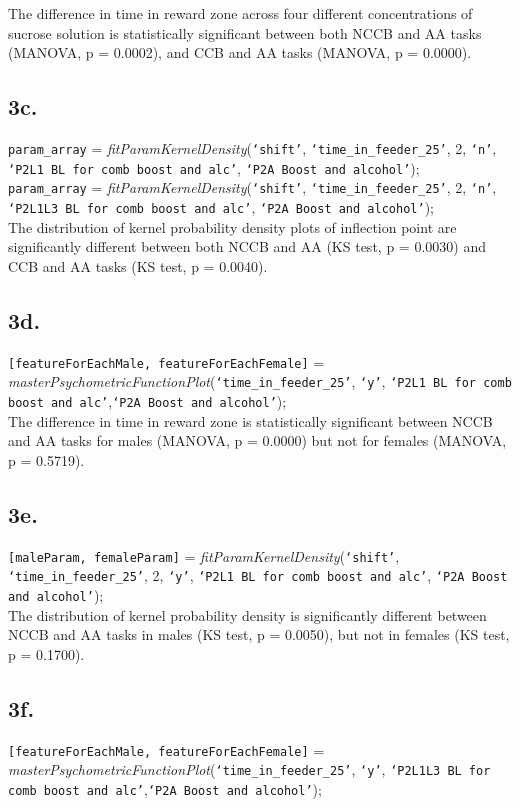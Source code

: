 \documentclass{article}
\begin{document}
The difference in time in reward zone across four different concentrations of sucrose solution is statistically significant between both NCCB and AA tasks (MANOVA, p = 0.0002), and CCB and AA tasks (MANOVA, p = 0.0000).

\subsection{3c.}
\texttt{param\_array} = \emph{fitParamKernelDensity}(\texttt{`shift'}, \texttt{`time\_in\_feeder\_25'}, 2, \texttt{`n'}, \texttt{`P2L1 BL for comb boost and alc'}, \texttt{`P2A Boost and alcohol'});\\
\texttt{param\_array} = \emph{fitParamKernelDensity}(\texttt{`shift'}, \texttt{`time\_in\_feeder\_25'}, 2, \texttt{`n'}, \texttt{`P2L1L3 BL for comb boost and alc'}, \texttt{`P2A Boost and alcohol'});\\

The distribution of kernel probability density plots of inflection point are significantly different between both NCCB and AA (KS test, p = 0.0030) and CCB and AA tasks (KS test, p = 0.0040).

\subsection{3d.}
\texttt{[featureForEachMale, featureForEachFemale]} = \emph{masterPsychometricFunctionPlot}(\texttt{`time\_in\_feeder\_25'}, \texttt{`y'}, \texttt{`P2L1 BL for comb boost and alc'},\texttt{`P2A Boost and alcohol'});\\

The difference in time in reward zone is statistically significant between NCCB and AA tasks for males (MANOVA, p = 0.0000) but not for females (MANOVA, p = 0.5719).

\subsection{3e.}
\texttt{[maleParam, femaleParam]} = \emph{fitParamKernelDensity}(\texttt{`shift'}, \texttt{`time\_in\_feeder\_25'}, 2, \texttt{`y'}, \texttt{`P2L1 BL for comb boost and alc'}, \texttt{`P2A Boost and alcohol'});\\

The distribution of kernel probability density is significantly different between NCCB and AA tasks in males (KS test, p = 0.0050), but not in females (KS test, p = 0.1700). 

\subsection{3f.}
\texttt{[featureForEachMale, featureForEachFemale]} = \emph{masterPsychometricFunctionPlot}(\texttt{`time\_in\_feeder\_25'}, \texttt{`y'}, \texttt{`P2L1L3 BL for comb boost and alc'},\texttt{`P2A Boost and alcohol'});\\
\end{document}
